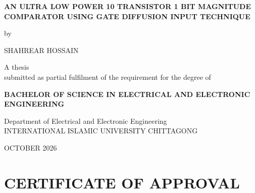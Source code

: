 \documentclass[12pt,a4paper,oneside]{report}
\begin{document}
\thispagestyle{empty}
\begin{center}
\vspace*{0.5cm}
{{\fontsize{18}{22}\selectfont
  \rmfamily\bfseries\MakeUppercase{An Ultra Low Power 10 Transistor 1 Bit Magnitude Comparator Using Gate Diffusion Input Technique}\par}}

\vspace{2.5cm}
by

\vspace{0.5cm}
{\normalsize SHAHREAR HOSSAIN}

\vspace{2cm}

A thesis\\
submitted as partial fulfilment of the requirement for the degree of

\vspace{0.5cm}
\bfseries { BACHELOR OF SCIENCE IN ELECTRICAL AND ELECTRONIC 
\\ ENGINEERING\\}

\vspace{2.5cm}


\vspace{4.0cm}

{\mdseries Department of Electrical and Electronic Engineering\\ INTERNATIONAL ISLAMIC UNIVERSITY CHITTAGONG}


\vspace{0.5cm}
\MakeUppercase {{\mdseries October 2026}}
\end{center}
\clearpage

\thispagestyle{empty}
\mbox{}
\vfill
\begin{center}
\end{center}
\vfill
\clearpage

\setcounter{page}{2}

\chapter*{CERTIFICATE OF APPROVAL}
\end{document}
